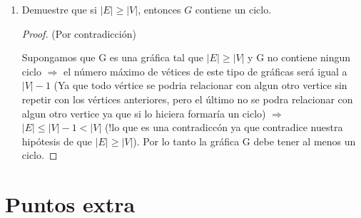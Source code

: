 \documentclass{article}
\begin{document}
\begin{enumerate}
  \textit{\textbf{Soluci\'on:}}
  \begin{itemize}
  \item[$k = 0$)] Son todas las gráficas que no tienen aristas, a estas se les conoce
    como g\'aficas vac\'ias.
  \item[$k = 1$)] Estas son gr\'aficas con una cantidad de v\'ertices par y son tantas
    uniones de $P_2$ como $\frac{|V_G|}{2}$. Las gráficas con $|V_G|$ impar no entran
    aqu\'i porque siempre habr\'a $(|V_G| - 1) P_2$ y alg\'un v\'ertice (aislado) será
    de grado igual a $0$!! (o, pensando en lazos, de grado igual a 2), lo que contradice
    el ser $1-$regular.
  \item[$k = 2$)] Son gr\'aficas que contienen ciclos o son combinaciones de ciclos.
    Todos los ciclos son $2-$regulares, esto no implica que todas las gr\'aficas
    $2-$regulares sean un ciclo pero si que los contengan o que sean combinaciones
    de estos.
  \end{itemize}
  Con los $3$ puntos anteriores concluimos la caracterización. \hfill $\square$
\item Demuestre que si $|E| \ge |V|$, entonces $G$ contiene un ciclo.
  \renewcommand\qedsymbol{QED}
  \begin{proof} (Por contradicción)

    Supongamos que G es una gráfica tal que $|E|\geq|V|$ y G no contiene
    ningun ciclo $\Longrightarrow$ el número máximo de vétices de este
    tipo de gráficas será igual a $|V|-1$ (Ya que todo vértice se podria
    relacionar con algun otro vertice sin repetir con los vértices anteriores,
    pero el último no se podra relacionar con algun otro vertice ya que
    si lo hiciera formaría un ciclo) $\Longrightarrow$ $|E|\leq|V|-1 < |V|$
    (!lo que es una contradiccón ya que contradice nuestra hipótesis de que
    $|E|\geq|V|$). Por lo tanto la gráfica G debe tener al menos un ciclo.

  \end{proof}
\end{enumerate}

\section*{Puntos extra}
\end{document}
